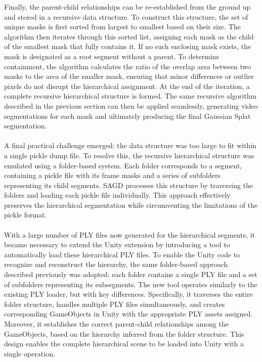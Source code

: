 \documentclass[12pt]{article}
\begin{document}
Finally, the parent-child relationships can be re-established from the ground up and stored in a recursive data structure. To construct this structure, the set of unique masks is first sorted from largest to smallest based on their size. The algorithm then iterates through this sorted list, assigning each mask as the child of the smallest mask that fully contains it. If no such enclosing mask exists, the mask is designated as a root segment without a parent. To determine containment, the algorithm calculates the ratio of the overlap area between two masks to the area of the smaller mask, ensuring that minor differences or outlier pixels do not disrupt the hierarchical assignment. At the end of the iteration, a complete recursive hierarchical structure is formed. The same recursive algorithm described in the previous section can then be applied seamlessly, generating video segmentations for each mask and ultimately producing the final Gaussian Splat segmentation.
\\\\
A final practical challenge emerged: the data structure was too large to fit within a single pickle dump file. To resolve this, the recursive hierarchical structure was emulated using a folder-based system. Each folder corresponds to a segment, containing a pickle file with its frame masks and a series of subfolders representing its child segments. SAGD processes this structure by traversing the folders and loading each pickle file individually. This approach effectively preserves the hierarchical segmentation while circumventing the limitations of the pickle format.
\\\\
With a large number of PLY files now generated for the hierarchical segments, it became necessary to extend the Unity extension by introducing a tool to automatically load these hierarchical PLY files. To enable the Unity code to recognize and reconstruct the hierarchy, the same folder-based approach described previously was adopted: each folder contains a single PLY file and a set of subfolders representing its subsegments. The new tool operates similarly to the existing PLY loader, but with key differences. Specifically, it traverses the entire folder structure, handles multiple PLY files simultaneously, and creates corresponding GameObjects in Unity with the appropriate PLY assets assigned. Moreover, it establishes the correct parent-child relationships among the GameObjects, based on the hierarchy inferred from the folder structure. This design enables the complete hierarchical scene to be loaded into Unity with a single operation.
\end{document}
